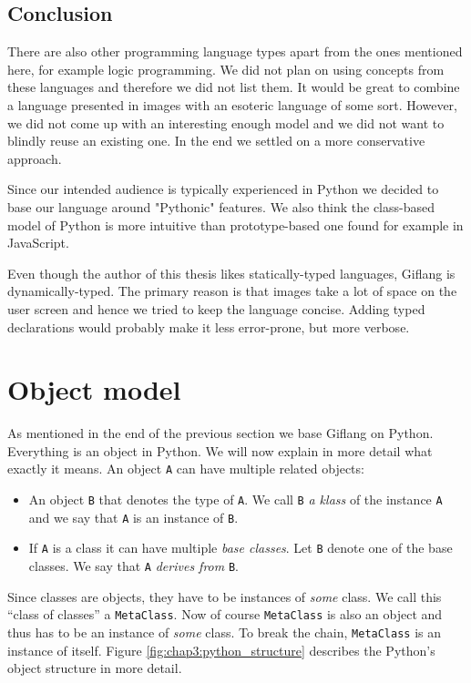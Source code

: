\subsection{Conclusion}
There are also other programming language types apart from the ones mentioned here, for example logic programming. We did not plan on using
concepts from these languages and therefore we did not list them. It would be great to combine a language presented in images with an esoteric language
of some sort. However, we did not come up with an interesting enough model and we did not want to blindly reuse an existing one. In the end we settled on
a more conservative approach.

Since our intended audience is typically experienced in Python we decided to base our language around "Pythonic" features. We also think
the class-based model of Python is more intuitive than prototype-based one found for example in JavaScript.

Even though the author of this thesis likes statically-typed languages, Giflang is dynamically-typed. The primary reason is that images take a lot of
space on the user screen and hence we tried to keep the language concise. Adding typed declarations would probably make it less error-prone, but more verbose.

\section{Object model}
\label{chap3:object_model}
As mentioned in the end of the previous section we base Giflang on Python. Everything is an object in Python. We will now explain in more detail what exactly
it means. An object \texttt{A} can have multiple related objects:
\begin{itemize}
    \item An object \texttt{B} that denotes the type of \texttt{A}. We call \texttt{B} \emph{a klass} of the instance \texttt{A} and we say that \texttt{A}
    is an instance of \texttt{B}.
    \item If \texttt{A} is a class it can have multiple \emph{base classes}. Let \texttt{B} denote one of the base classes. We say that \texttt{A}
    \emph{derives from} \texttt{B}. 
\end{itemize}

Since classes are objects, they have to be instances of \emph{some} class. We call this ``class of classes'' a \texttt{MetaClass}. Now of course
\texttt{MetaClass} is also an object and thus has to be an instance of \emph{some} class. To break the chain, \texttt{MetaClass} is an instance of itself.
Figure \ref{fig:chap3:python_structure} describes the Python's object structure in more detail.

